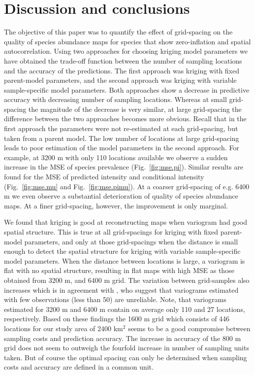 \documentclass[review]{elsarticle}
\begin{document}
\section{Discussion and conclusions}\label{sec:discussion}
The objective of this paper was to quantify the effect of grid-spacing on the quality of species abundance maps for species that show zero-inflation and spatial autocorrelation.
Using two approaches for choosing kriging model parameters we have obtained the trade-off function between the number of sampling locations and the accuracy of the predictions.
The first approach was kriging with fixed parent-model parameters, and the second approach was kriging with variable sample-specific model parameters.
Both approaches show a decrease in predictive accuracy with decreasing number of sampling locations.
Whereas at small grid-spacing the magnitude of the decrease is very similar,  at large grid-spacing the difference between the two approaches becomes more obvious.
Recall that in the first approach the parameters were not re-estimated at each grid-spacing, but taken from a parent model.
The low number of locations at large grid-spacing leads to poor estimation of the model parameters in the second approach.
For example, at 3200 m with only 110 locations available we observe a sudden increase in the MSE of species prevalence (Fig.~\ref{fig:mse.pi}).
Similar results are found for the MSE of predicted intensity and conditional intensity (Fig.~\ref{fig:mse.mu} and Fig.~\ref{fig:mse.pimu}).
At a coarser grid-spacing of e.g. 6400 m we even observe a substantial deterioration of quality of species abundance maps.
At a finer grid-spacing, however, the improvement is only marginal.

We found that kriging is good at reconstructing maps when variogram had good spatial structure.
This is true at all grid-spacings for kriging with fixed parent-model parameters, and only at those grid-spacings when the distance is small enough to detect the spatial structure for kriging with variable sample-specific model parameters.
When the distance between locations is large, a variogram is flat with no spatial structure, resulting in flat maps with high MSE as those obtained from 3200 m, and 6400 m grid.
The variation between grid-samples also increases which is in agreement with \citet{webster1993}, who suggest that variograms estimated with few observations (less than 50) are unreliable.
Note, that variograms estimated for 3200 m and 6400 m contain on average only 110 and 27 locations, respectively.
Based on these findings the 1600 m grid which consists of 446 locations for our study area of 2400 km$^{2}$ seems to be a good compromise between sampling costs and prediction accuracy.
The increase in accuracy of the 800 m grid does not seem to outweigh the fourfold increase in number of sampling units taken.
But of course the optimal spacing can only be determined when sampling costs and accuracy are defined in a common unit.
\end{document}
